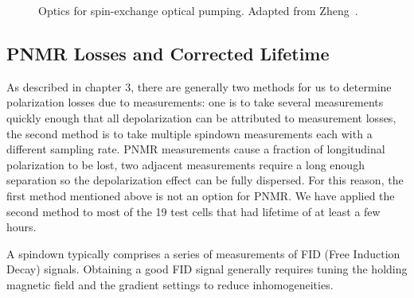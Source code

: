 \begin{figure}[t!]
	\centering
	\caption{{Optics for spin-exchange optical pumping. Adapted from Zheng~\cite{YuanThesis}.}}
	\label{optics}
\end{figure}

\subsection{PNMR Losses and Corrected Lifetime}

As described in chapter 3, there are generally two methods for us to determine polarization losses due to measurements: one is to take several measurements quickly enough that all depolarization can be attributed to measurement losses, the second method is to take multiple spindown measurements each with a different sampling rate. PNMR measurements cause a fraction of longitudinal polarization to be lost, two adjacent measurements require a long enough separation so the depolarization effect can be fully dispersed. For this reason, the first method mentioned above is not an option for PNMR. We have applied the second method to most of the 19 test cells that had lifetime of at least a few hours.

A spindown typically comprises a series of measurements of FID (Free Induction Decay) signals. Obtaining a good FID signal generally requires tuning the holding magnetic field and the gradient settings to reduce inhomogeneities.

